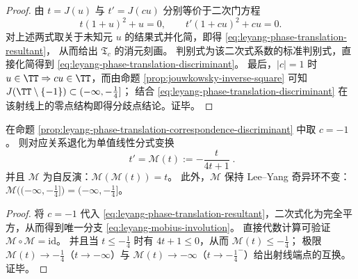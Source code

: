 \begin{proof}
由 \(t=J(u)\) 与 \(t'=J(cu)\) 分别等价于二次门方程
\[
t(1+u)^2+u=0,
\qquad
t'(1+cu)^2+cu=0.
\]
对上述两式取关于未知元 \(u\) 的结果式并化简，即得 \eqref{eq:leyang-phase-translation-resultant}，
从而给出 \(\mathfrak{T}_c\) 的消元刻画。
判别式为该二次式系数的标准判别式，直接化简得到 \eqref{eq:leyang-phase-translation-discriminant}。
最后，\(|c|=1\) 时 \(u\in\TT\Rightarrow cu\in\TT\)，而由命题 \ref{prop:jouwkowsky-inverse-square} 可知 \(J(\TT\setminus\{-1\})\subset(-\infty,-\tfrac14]\)；
结合 \eqref{eq:leyang-phase-translation-discriminant} 在该射线上的零点结构即得分歧点结论。证毕。
\end{proof}

\begin{corollary}\label{cor:leyang-quarterphase-mobius-involution}
在命题 \ref{prop:leyang-phase-translation-correspondence-discriminant} 中取 \(c=-1\)。
则对应关系退化为单值线性分式变换
\begin{equation}\label{eq:leyang-mobius-involution}
\boxed{\;
t'=\mathscr{M}(t):=-\frac{t}{4t+1}\; }.
\end{equation}
并且 \(\mathscr{M}\) 为自反演：\(\mathscr{M}(\mathscr{M}(t))=t\)。
此外，\(\mathscr{M}\) 保持 Lee--Yang 奇异环不变：\(\mathscr{M}\bigl((-\infty,-\tfrac14]\bigr)=(-\infty,-\tfrac14]\)。
\end{corollary}

\begin{proof}
将 \(c=-1\) 代入 \eqref{eq:leyang-phase-translation-resultant}，二次式化为完全平方，从而得到唯一分支 \eqref{eq:leyang-mobius-involution}。
直接代数计算可验证 \(\mathscr{M}\circ\mathscr{M}=\mathrm{id}\)。
并且当 \(t\le -\tfrac14\) 时有 \(4t+1\le 0\)，从而 \(\mathscr{M}(t)\le -\tfrac14\)；
极限 \(\mathscr{M}(t)\to-\tfrac14\)（\(t\to-\infty\)）与 \(\mathscr{M}(t)\to-\infty\)（\(t\to-\tfrac14^-\)）给出射线端点的互换。证毕。
\end{proof}

\endinput
